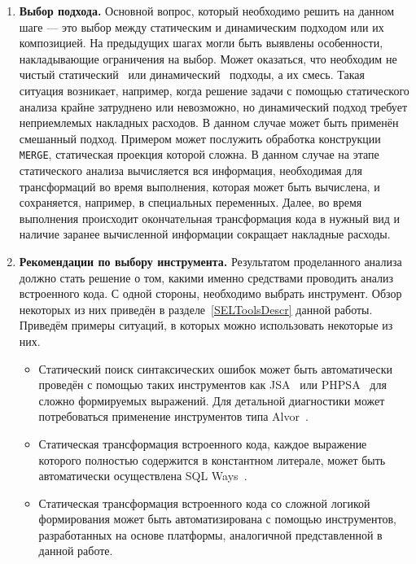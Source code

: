\begin{enumerate}
  \item \textbf{Выбор подхода.} Основной вопрос, который необходимо решить на данном шаге --- это выбор между статическим и динамическим подходом или их композицией. На предыдущих шагах могли быть выявлены особенности, накладывающие ограничения на выбор. Может оказаться, что необходим не чистый статический~\cite{Syrcose} или динамический~\cite{DynamicDSQLTranslation} подходы, а их смесь. Такая ситуация возникает, например, когда решение задачи с помощью статического анализа крайне затруднено или невозможно, но динамический подход требует неприемлемых накладных расходов. В данном случае может быть применён смешанный подход. Примером может послужить обработка конструкции \verb|MERGE|, статическая проекция которой сложна. В данном случае на этапе статического анализа вычисляется вся информация, необходимая для трансформаций во время выполнения, которая может быть вычислена, и сохраняется, например, в специальных переменных. Далее, во время выполнения происходит окончательная трансформация кода в нужный вид и наличие заранее вычисленной информации сокращает накладные расходы.
  
  \item \textbf{Рекомендации по выбору инструмента.} Результатом проделанного анализа должно стать решение о том, какими именно средствами проводить анализ встроенного кода. С одной стороны, необходимо выбрать инструмент. Обзор некоторых из них приведён в разделе~\ref{SELToolsDescr} данной работы. Приведём примеры ситуаций, в которых можно использовать некоторые из них.
  \begin{itemize}
    \item Статический поиск синтаксических ошибок может быть автоматически проведён с помощью таких инструментов как JSA~\cite{JSAUrl} или PHPSA~\cite{PHPSAUrl} для сложно формируемых выражений. Для детальной диагностики может потребоваться применение инструментов типа Alvor~\cite{AlvorUrl}.
    \item Статическая трансформация встроенного кода, каждое выражение которого полностью содержится в константном литерале, может быть автоматически осуществлена SQL Ways~\cite{SQLWays}.
    \item Статическая трансформация встроенного кода со сложной логикой формирования может быть автоматизирована с помощью инструментов, разработанных на основе платформы, аналогичной представленной в данной работе.
  \end{itemize}
  

\end{enumerate}
